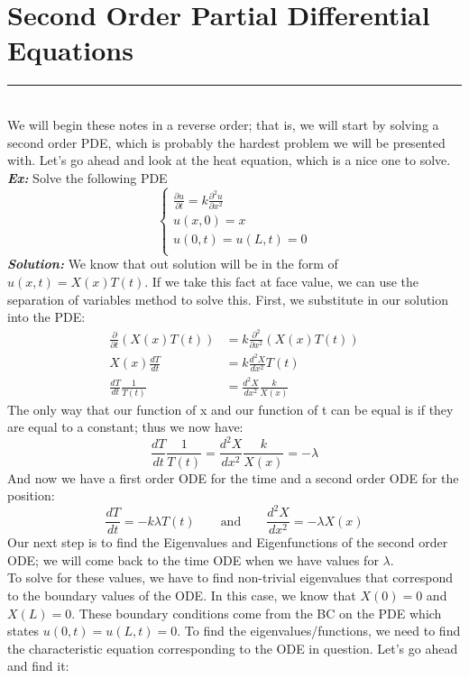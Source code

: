 \documentclass{article}
\begin{document}
\section{Second Order Partial Differential Equations}
\hrule
\noindent\\
\indent We will begin these notes in a reverse order; that is, we will start by solving a second order PDE, which is probably the hardest problem we will be presented with. Let's go ahead and look at the heat equation, which is a nice one to solve.\\
\noindent \textbf{\textit{Ex:}} Solve the following PDE
\[
\begin{cases}
\frac{\partial u}{\partial t} = k \frac{\partial^{2} u}{\partial x^{2}}\\
u(x,0) = x\\
u(0,t) = u(L,t) = 0\\
\end{cases}
\]
\indent \textbf{\textit{Solution:}} We know that out solution will be in the form of $ u(x,t) = X(x)T(t) $. If we take this fact at face value, we can use the separation of variables method to solve this. First, we substitute in our solution into the PDE:
\begin{align*}
\frac{\partial}{\partial t}(X(x)T(t)) &= k \frac{\partial^{2}}{\partial x^{2}}(X(x)T(t))\\
X(x)\frac{dT}{dt} &= k\frac{d^{2}X}{dx^{2}}T(t)\\
\frac{dT}{dt}\frac{1}{T(t)} &= \frac{d^{2}X}{dx^{2}}\frac{k}{X(x)}
\end{align*}
\noindent The only way that our function of x and our function of t can be equal is if they are equal to a constant;
thus we now have:
\[
\frac{dT}{dt}\frac{1}{T(t)} = \frac{d^{2}X}{dx^{2}}\frac{k}{X(x)} = -\lambda
\]
\noindent And now we have a first order ODE for the time and a second order ODE for the position:
\[
\frac{dT}{dt} = -k \lambda T(t) \qquad\text{and}\qquad \frac{d^{2}X}{dx^{2}} = -\lambda X(x)
\]
\noindent Our next step is to find the Eigenvalues and Eigenfunctions of the second order ODE; we will come back to the time ODE when we have values for $\lambda$.\\ 
\indent To solve for these values, we have to find non-trivial eigenvalues that correspond to the boundary values of the ODE. In this case, we know that $X(0) = 0$ and $X(L) = 0$. These boundary conditions come from the BC on the PDE which states $u(0,t) = u(L,t) = 0$. To find the eigenvalues/functions, we need to find the characteristic equation corresponding to the ODE in question. Let's go ahead and find it:
\end{document}
